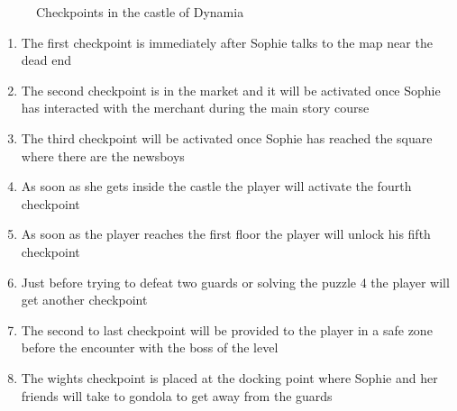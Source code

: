 \begin{center}
\begin{figure}[H]
    \caption{Checkpoints in the castle of Dynamia}
  \end{figure}
 \begin{enumerate}
 \item The first checkpoint is immediately after Sophie talks to the map near the dead end
 \item The second checkpoint is in the market and it will be activated once Sophie has interacted with the merchant during the main story course
 \item The third checkpoint will be activated once Sophie has reached the square where there are the newsboys
 \item As soon as she gets inside the castle the player will activate the fourth checkpoint
 \item As soon as the player reaches the first floor the player will unlock his fifth checkpoint
 \item Just before trying to defeat two guards or solving the puzzle 4  the player will get another checkpoint
 \item The second to last checkpoint will be provided to the player in a safe zone before the encounter with the boss of the level
 \item The wights checkpoint is placed at the docking point where Sophie and her friends will take to gondola to get away from the guards
 \end{enumerate}

\end{center}
